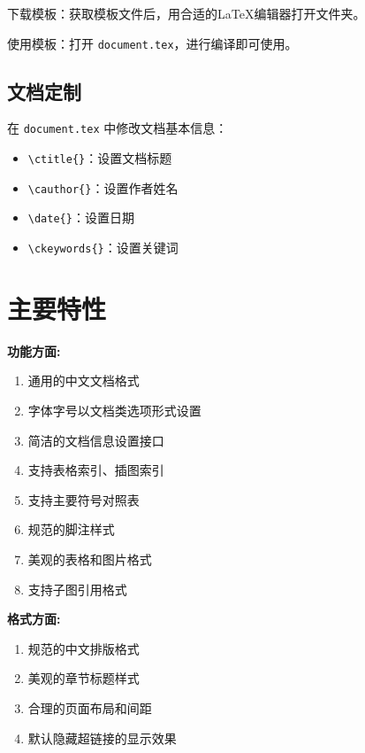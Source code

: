 下载模板：获取模板文件后，用合适的LaTeX编辑器打开文件夹。

使用模板：打开 \verb|document.tex|，进行编译即可使用。

\subsection{文档定制}
在 \verb|document.tex| 中修改文档基本信息：
\begin{itemize}
    \item \verb|\ctitle{}|：设置文档标题
    \item \verb|\cauthor{}|：设置作者姓名
    \item \verb|\date{}|：设置日期
    \item \verb|\ckeywords{}|：设置关键词
\end{itemize}

\section{主要特性}

\textbf{功能方面:}

\begin{enumerate}[leftmargin=5em]
    \item 通用的中文文档格式
    \item 字体字号以文档类选项形式设置
    \item 简洁的文档信息设置接口
    \item 支持表格索引、插图索引
    \item 支持主要符号对照表
    \item 规范的脚注样式
    \item 美观的表格和图片格式
    \item 支持子图引用格式
\end{enumerate}

\textbf{格式方面:}

\begin{enumerate}[leftmargin=5em]
    \item 规范的中文排版格式
    \item 美观的章节标题样式
    \item 合理的页面布局和间距
    \item 默认隐藏超链接的显示效果
\end{enumerate}
